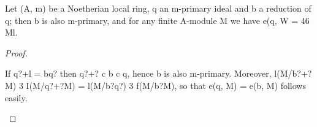 \begin{theorem}[Theorem 14.13]\label{mcrt-auto-theorem-14-13}\uses{}
\begin{mathematicalrecord}
Let (A, m) be a Noetherian local ring, q an m-primary ideal
and b a reduction of q; then b is also m-primary, and for any finite A-module
M we have
         e(q, W = 46 Ml.
\end{mathematicalrecord}
\end{theorem}
\begin{proof}
\begin{mathematicalrecord}
If q?+l = bq? then q?+? c b c q, hence b is also m-primary.
Moreover,
         l(M/b?+?M)         3 I(M/q?+?M)   = l(M/b?q?)   3 f(M/b?M),
so that e(q, M) = e(b, M) follows easily.
\end{mathematicalrecord}
\end{proof}


